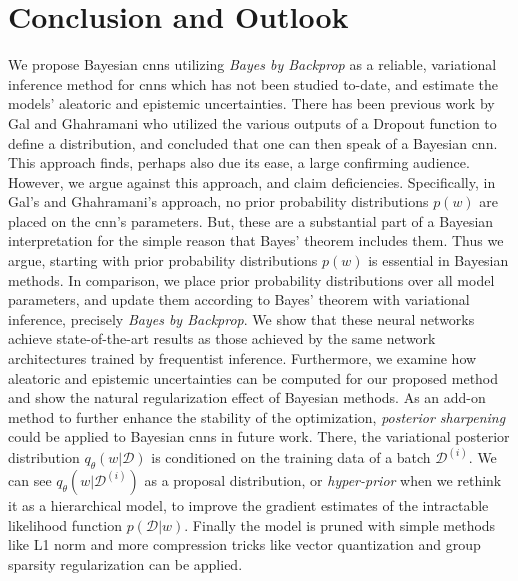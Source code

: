 \chapter{Conclusion and Outlook}

We propose Bayesian \acp{cnn} utilizing \textit{Bayes by Backprop} as a reliable, variational inference method for \acp{cnn} which has not been studied to-date, and estimate the models' aleatoric and epistemic uncertainties.
\newline There has been previous work by Gal and Ghahramani \cite{gal2015bayesian} who utilized the various outputs of a Dropout function to define a distribution, and concluded that one can then speak of a Bayesian \ac{cnn}. This approach finds, perhaps also due its ease, a large confirming audience. However, we argue against this approach, and claim deficiencies. Specifically, in Gal's and Ghahramani's \cite{gal2015bayesian} approach, no prior probability distributions $p(w)$ are placed on the \ac{cnn}'s parameters. But, these are a substantial part of a Bayesian interpretation for the simple reason that Bayes' theorem includes them. Thus we argue, starting with prior probability distributions $p(w)$ is essential in Bayesian methods. In comparison, we place prior probability distributions over all model parameters, and update them according to Bayes' theorem with variational inference, precisely \textit{Bayes by Backprop}. We show that these neural networks achieve state-of-the-art results as those achieved by the same network architectures trained by frequentist inference. Furthermore, we examine how aleatoric and epistemic uncertainties can be computed for our proposed method and show the natural regularization effect of Bayesian methods.
\newline As an add-on method to further enhance the stability of the optimization, \textit{posterior sharpening} \cite{fortunato2017bayesian} could be applied to Bayesian \acp{cnn} in future work. There, the variational posterior distribution $q_{\theta}(w|\mathcal{D})$ is conditioned on the training data of a batch $\mathcal{D}^{(i)}$. We can see $q_{\theta}(w|\mathcal{D}^{(i)})$ as a proposal distribution, or \textit{hyper-prior} when we rethink it as a hierarchical model, to improve the gradient estimates of the intractable likelihood function $p(\mathcal{D}|w)$. Finally the model is pruned with simple methods like L1 norm and more compression tricks like vector quantization \cite{DBLP:journals/corr/GongLYB14} and group sparsity regularization  \cite{DBLP:conf/nips/AlvarezS16} can be applied. 
%